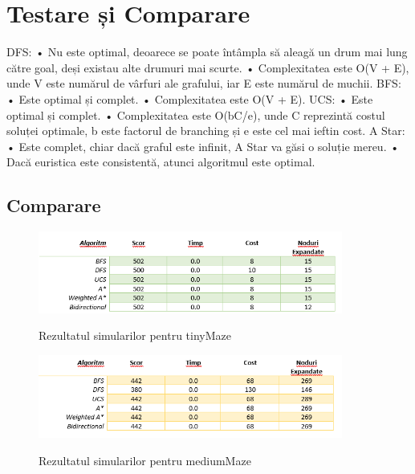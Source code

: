 \section{Testare și Comparare}

DFS:\newline
• Nu este optimal, deoarece se poate întâmpla să aleagă un drum mai lung către goal, deși existau alte drumuri mai scurte.\newline
• Complexitatea este O(V + E), unde V este numărul de vârfuri ale grafului, iar E este numărul de muchii.\newline\newline
BFS:\newline
• Este optimal și complet.\newline
• Complexitatea este O(V + E).\newline\newline
UCS:\newline
• Este optimal și complet.\newline
• Complexitatea este O(bC/e), unde C reprezintă costul soluței optimale, b este factorul de branching
și e este cel mai ieftin cost.\newline\newline
A Star:\newline
• Este complet, chiar dacă graful este infinit, A Star va găsi o soluție mereu.\newline
• Dacă euristica este consistentă, atunci algoritmul este optimal.
 \newline


\subsection{Comparare}

\begin{figure}[h]
    \centering
    \includegraphics[width=10cm]{text/images/pic2.png}\\
    \caption{Rezultatul simularilor pentru tinyMaze}
\end{figure}

\begin{figure}[h]
    \centering
    \includegraphics[width=10cm]{text/images/pic3.png}\\
    \caption{Rezultatul simularilor pentru mediumMaze}
\end{figure}

